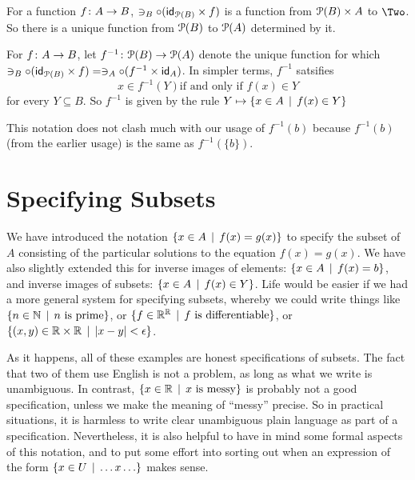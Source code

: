 For a function ${f}\colon{A}\to{B}$, $\ni_B\circ (\textsf{id}_{{\mathcal{P}}(B)}\times f)$ is a function from ${\mathcal{P}}(B)\times A$ to $\Two$. So there is a unique function
from ${\mathcal{P}}(B)$ to ${\mathcal{P}}(A)$ determined by it. 

\begin{defn}
	For ${f}\colon{A}\to{B}$, let ${f^{-1}}\colon{{\mathcal{P}}(B)}\to{{\mathcal{P}}(A)}$ denote
	the unique function for which $\ni_B\circ (\textsf{id}_{{\mathcal{P}}(B)}\times f) = \ni_A\circ(f^{-1}\times \textsf{id}_A)$. In simpler terms, $f^{-1}$ satsifies
	\[x\in f^{-1}(Y) \text{if and only if } f(x)\in Y\]
	for every $Y\subseteq B$.  So $f^{-1}$ is given by the rule $Y\mapsto \{x\in A\,\mid\, f(x)\in Y\}$
\end{defn}

This notation does not clash much with our usage of $f^{-1}(b)$ because 
$f^{-1}(b)$ (from the earlier usage) is the same as $f^{-1}(\{b\})$.

\section{Specifying Subsets}

We have introduced the notation $\{x\in A\,\mid\, f(x)=g(x)\}$ to specify the subset of $A$ consisting of the particular solutions to the equation $f(x)=g(x)$. 
We have also slightly extended this for inverse images of elements: $\{x\in A \,\mid\, f(x)=b\}$, and inverse images of subsets: $\{x\in A\,\mid\, f(x)\in Y\}$. 
Life would be easier if we had a more general system for specifying subsets, whereby we could write things like $\{n\in \mathbb N \,\mid\, \text{$n$ is prime}\}$, or $\{f\in \mathbb R^\mathbb R\,\mid\, \text{$f$ is differentiable}\}$, or $\{(x,y)\in \mathbb R\times \mathbb R\,\mid\, |x-y| < \epsilon\}$. 

As it happens, all of these examples are honest specifications of subsets. 
The fact that two of them use English is not a problem, as long as what we write is unambiguous. 
In contrast, $\{x\in \mathbb R\,\mid\, \text{$x$ is messy}\}$ is probably not a good specification, unless we make the meaning of ``messy'' precise. 
So in practical situations, it is harmless to write clear unambiguous plain language as part of a specification. 
Nevertheless, it is also helpful to have in mind some formal aspects of this notation, and to put some effort into sorting out when an expression of the form
$\{x\in U\,\mid\, \ldots x \ldots\}$ makes sense.

